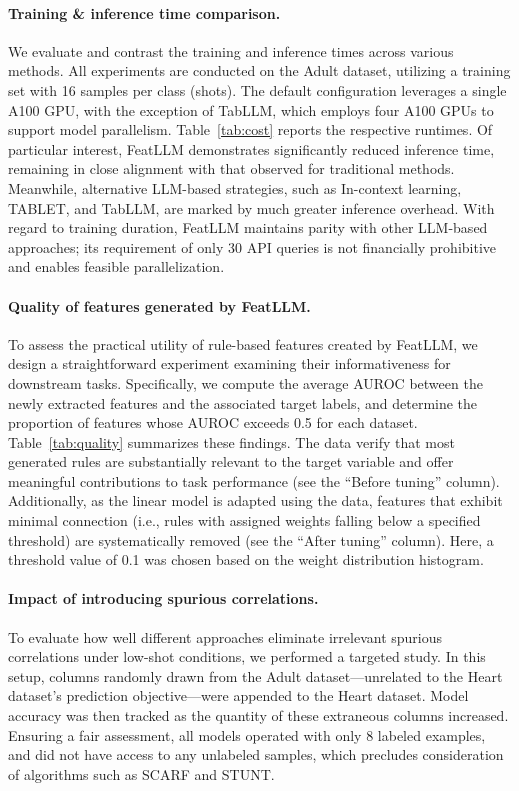 \vspace*{-0.12in}
\paragraph{Training \& inference time comparison.} We evaluate and contrast the training and inference times across various methods. All experiments are conducted on the Adult dataset, utilizing a training set with 16 samples per class (shots). The default configuration leverages a single A100 GPU, with the exception of TabLLM, which employs four A100 GPUs to support model parallelism. Table~\ref{tab:cost} reports the respective runtimes. Of particular interest, \textsf{FeatLLM} demonstrates significantly reduced inference time, remaining in close alignment with that observed for traditional methods. Meanwhile, alternative LLM-based strategies, such as In-context learning, TABLET, and TabLLM, are marked by much greater inference overhead. With regard to training duration, \textsf{FeatLLM} maintains parity with other LLM-based approaches; its requirement of only 30 API queries is not financially prohibitive and enables feasible parallelization.

\vspace*{-0.12in}
\paragraph{Quality of features generated by \textsf{FeatLLM}.}
To assess the practical utility of rule-based features created by \textsf{FeatLLM}, we design a straightforward experiment examining their informativeness for downstream tasks. Specifically, we compute the average AUROC between the newly extracted features and the associated target labels, and determine the proportion of features whose AUROC exceeds 0.5 for each dataset. 
Table~\ref{tab:quality} summarizes these findings. The data verify that most generated rules are substantially relevant to the target variable and offer meaningful contributions to task performance (see the ``Before tuning'' column). Additionally, as the linear model is adapted using the data, features that exhibit minimal connection (i.e., rules with assigned weights falling below a specified threshold) are systematically removed (see the ``After tuning'' column). Here, a threshold value of 0.1 was chosen based on the weight distribution histogram.

\vspace*{-0.12in}
\paragraph{Impact of introducing spurious correlations.} To evaluate how well different approaches eliminate irrelevant spurious correlations under low-shot conditions, we performed a targeted study. In this setup, columns randomly drawn from the Adult dataset—unrelated to the Heart dataset's prediction objective—were appended to the Heart dataset. Model accuracy was then tracked as the quantity of these extraneous columns increased. Ensuring a fair assessment, all models operated with only 8 labeled examples, and did not have access to any unlabeled samples, which precludes consideration of algorithms such as SCARF and STUNT.

